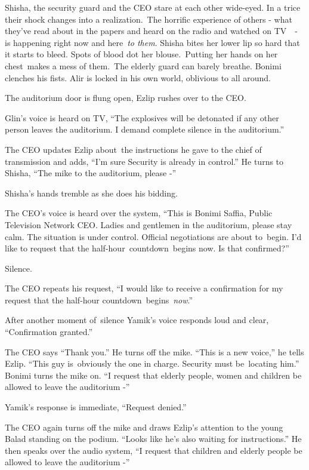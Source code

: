 \documentclass[twoside,11pt]{book}
\begin{document}
Shisha, the security guard and the CEO stare at each other wide-eyed. In a trice their shock changes into a
realization.\ The horrific experience of others -  what they've read about in the papers and heard on the radio and
watched on TV\ \ {}- is happening right now and here\ \textit{to them}. Shisha bites her lower lip so hard that it
starts to bleed. Spots of blood dot her blouse.\ Putting her hands on her chest\ makes a mess of them.\ The elderly
guard can barely breathe. Bonimi clenches his fists. Alir is locked in his own world, oblivious to all around.\ 

The auditorium door is flung open, Ezlip rushes over to the CEO.\ 

Glin's voice is heard on TV, ``The explosives will be detonated if any other person leaves the auditorium.
I demand complete silence in the auditorium.''

The CEO updates Ezlip about~the instructions he gave to the chief of transmission and adds, ``I'm sure
Security is already in control.'' He turns to Shisha, ``The mike to the auditorium, please
-''

Shisha's hands tremble as she does his bidding.

The CEO's voice is heard over the system, ``This is Bonimi Saffia, Public Television Network CEO. Ladies
and gentlemen in the auditorium, please stay calm. The situation is under control. Official negotiations are about
to{\ }begin. I'd like to request that the
half{}-hour{\ }countdown{\ }begins now. Is that confirmed?''

Silence.

The CEO repeats his request, ``I would like to receive a confirmation for my request that the half{}-hour
countdown\ begins\ \textit{now}.''

After another moment of\ silence Yamik's voice responds loud and clear, ``Confirmation
granted.'' 

The CEO says ``Thank you.'' He turns off the mike. ``This is a new voice,'' he
tells Ezlip. ``This guy is{\ }obviously the one in charge. Security must
be{\ }locating him.'' Bonimi turns the mike on. ``I request that elderly
people, women and children be allowed to leave the auditorium -''

Yamik's response is immediate, ``Request denied.''

The CEO again turns off the mike and draws Ezlip's attention to the young Balad standing on the podium. ``Looks like
he's also waiting for instructions.'' He then speaks over the audio system, ``I request that
children and elderly people be allowed to leave the auditorium -''
\end{document}
